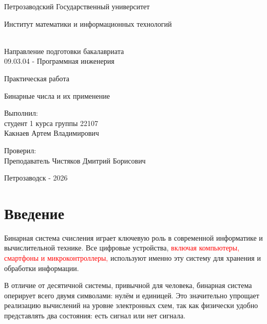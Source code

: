 \documentclass[a4paper, 12pt]{report}
\begin{document}
	
	\begin{titlepage}
		
		\begin{center}
			
			{\large
				Петрозаводский Государственный университет
				
				Институт математики и информационных технологий
			}\\
			
			Направление подготовки бакалавриата \\
			09.03.04 - Программная инженерия \\
			
			\vfill
			
			{\large
				Практическая работа
				
				Бинарные числа и их применение
			}
			
			\vfill
			
			\begin{flushright}
				\parbox{9 cm}{
				Выполнил:\\
				студент 1 курса группы 22107 \\
				Какнаев Артем Владимирович
				
				\vspace{1cm}
				
				Проверил: \\
				Преподаватель Чистяков Дмитрий Борисович
			}
			\end{flushright}

			\vfill
			{\large
				Петрозаводск - 2026
			}
			
		\end{center}
		
	\end{titlepage}
	
	\tableofcontents
	\newpage
	
	
	\chapter{Введение}	
	Бинарная система счисления играет ключевую роль в современной информатике и вычислительной технике. 
	Все цифровые устройства, \textcolor{red}{включая компьютеры, смартфоны и микроконтроллеры,} используют именно эту систему 
	для хранения и обработки информации.
	
	В отличие от десятичной системы, привычной для человека, бинарная система оперирует всего двумя символами: 
	нулём и единицей. Это значительно упрощает реализацию вычислений на уровне электронных схем, так как 
	физически удобно представлять два состояния: есть сигнал или нет сигнала.
	
\end{document}
